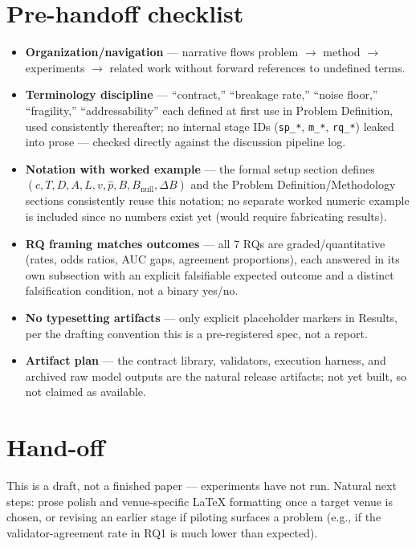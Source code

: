 \documentclass[11pt]{article}
\begin{document}
\section*{Pre-handoff checklist}
\begin{itemize}[leftmargin=1.4em]
\item \textbf{Organization/navigation} --- narrative flows problem $\to$ method $\to$ experiments $\to$ related work without forward references to undefined terms.
\item \textbf{Terminology discipline} --- ``contract,'' ``breakage rate,'' ``noise floor,'' ``fragility,'' ``addressability'' each defined at first use in Problem Definition, used consistently thereafter; no internal stage IDs (\texttt{sp\_*}, \texttt{m\_*}, \texttt{rq\_*}) leaked into prose --- checked directly against the discussion pipeline log.
\item \textbf{Notation with worked example} --- the formal setup section defines $(c, T, D, A, L, v, \hat{p}, B, B_{\text{null}}, \Delta B)$ and the Problem Definition/Methodology sections consistently reuse this notation; no separate worked numeric example is included since no numbers exist yet (would require fabricating results).
\item \textbf{RQ framing matches outcomes} --- all 7 RQs are graded/quantitative (rates, odds ratios, AUC gaps, agreement proportions), each answered in its own subsection with an explicit falsifiable expected outcome and a distinct falsification condition, not a binary yes/no.
\item \textbf{No typesetting artifacts} --- only explicit placeholder markers in Results, per the drafting convention this is a pre-registered spec, not a report.
\item \textbf{Artifact plan} --- the contract library, validators, execution harness, and archived raw model outputs are the natural release artifacts; not yet built, so not claimed as available.
\end{itemize}

\section*{Hand-off}
This is a draft, not a finished paper --- experiments have not run. Natural next steps: prose polish and venue-specific LaTeX formatting once a target venue is chosen, or revising an earlier stage if piloting surfaces a problem (e.g., if the validator-agreement rate in RQ1 is much lower than expected).
\end{document}
